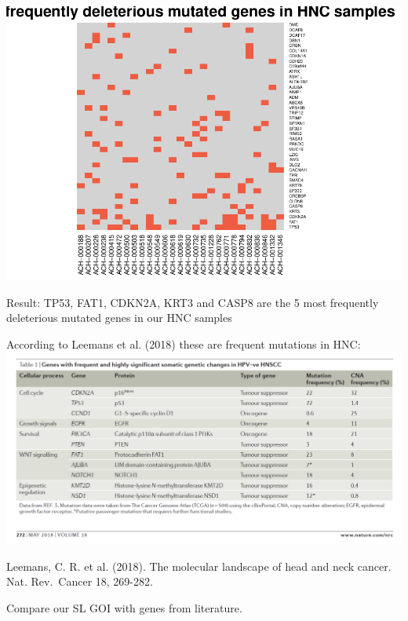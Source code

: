 \documentclass[]{article}
\begin{document}
\includegraphics{Project_HNC_files/figure-latex/2_SLgoi1-1.pdf}

Result: TP53, FAT1, CDKN2A, KRT3 and CASP8 are the 5 most frequently
deleterious mutated genes in our HNC samples

According to Leemans et al. (2018) these are frequent mutations in HNC:
\includegraphics{images/frequent_mutations_HNC.png}

Leemans, C. R. et al. (2018). The molecular landscape of head and neck
cancer. Nat. Rev.~Cancer 18, 269-282.

Compare our SL GOI with genes from literature.
\end{document}
